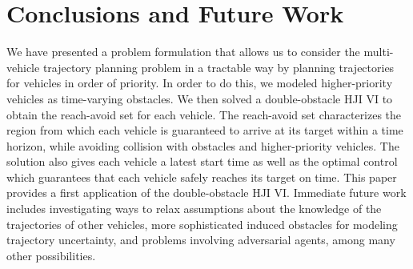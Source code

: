 \documentclass[letterpaper, 10pt, conference]{ieeeconf}      %
\begin{document}
% 
\section{Conclusions and Future Work}
We have presented a problem formulation that allows us to consider the multi-vehicle trajectory planning problem in a tractable way by planning trajectories for vehicles in order of priority. In order to do this, we modeled higher-priority vehicles as time-varying obstacles. We then solved a double-obstacle HJI VI to obtain the reach-avoid set for each vehicle. The reach-avoid set characterizes the region from which each vehicle is guaranteed to arrive at its target within a time horizon, while avoiding collision with obstacles and higher-priority vehicles. The solution also gives each vehicle a latest start time as well as the optimal control which guarantees that each vehicle safely reaches its target on time. This paper provides a first application of the double-obstacle HJI VI. Immediate future work includes investigating ways to relax assumptions about the knowledge of the trajectories of other vehicles, more sophisticated induced obstacles for modeling trajectory uncertainty, and problems involving adversarial agents, among many other possibilities.




\end{document}
